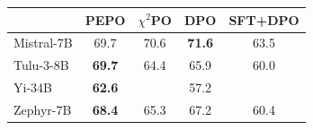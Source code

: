 \small
\begin{tabular}{lcccc}
\toprule
 & PEPO & $\chi^2$PO & DPO & SFT+DPO \\
\midrule
Mistral-7B & 69.7 & 70.6 & \textbf{71.6} & 63.5 \\
Tulu-3-8B & \textbf{69.7} & 64.4 & 65.9 & 60.0 \\
Yi-34B & \textbf{62.6} &  & 57.2 &  \\
Zephyr-7B & \textbf{68.4} & 65.3 & 67.2 & 60.4 \\
\bottomrule
\end{tabular}
